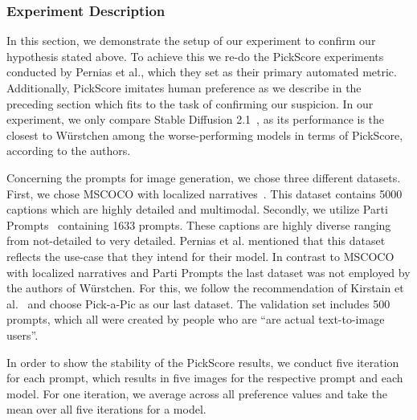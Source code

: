 \subsubsection{Experiment Description}
In this section, we demonstrate the setup of our experiment to confirm our
hypothesis stated above. To achieve this we re-do the PickScore
experiments conducted by Pernias et al., which they set as their primary
automated metric. Additionally, PickScore imitates human preference as we
describe in the preceding section which fits to the task of confirming our
suspicion. In our experiment, we only compare Stable Diffusion
2.1~\cite{rombach2023sd_2_1}, as its performance is the closest to W\"urstchen
among the worse-performing models in terms of PickScore, according to the
authors.

Concerning the prompts for image generation, we chose three different datasets.
First, we chose MSCOCO with localized narratives~\cite{PontTuset2020LocalizedNarratives}.
This dataset contains 5000 captions which are highly detailed and multimodal.
Secondly, we utilize Parti Prompts~\cite{yu2022scalingautoregressivemodelscontentrich}
containing 1633 prompts. These captions are highly diverse ranging from
not-detailed to very detailed. Pernias et al. mentioned that this dataset reflects
the use-case that they intend for their model. In contrast to MSCOCO with
localized narratives and Parti Prompts the last dataset was not employed by the
authors of W\"urstchen. For this, we follow the recommendation of Kirstain et
al.~\cite{kirstain2023pickapic} and choose Pick-a-Pic as our last dataset. The
validation set includes 500 prompts, which all were created by people who are
``are actual text-to-image users''\cite{kirstain2023pickapic}.

In order to show the stability of the PickScore results, we conduct five
iteration for each prompt, which results in five images for the respective
prompt and each model. For one iteration, we average across all preference
values and take the mean over all five iterations for a model.

